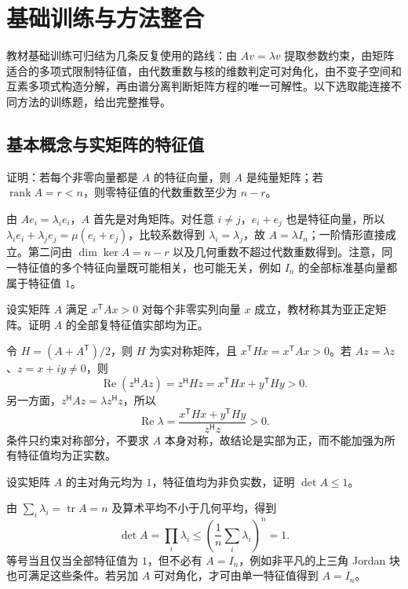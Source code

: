 \section{基础训练与方法整合}
\label{sec:xie-ex-eig-eigen-exercises}

教材基础训练可归结为几条反复使用的路线：由 $Av=\lambda v$ 提取参数约束，由矩阵适合的多项式限制特征值，由代数重数与核的维数判定可对角化，由不变子空间和互素多项式构造分解，再由谱分离判断矩阵方程的唯一可解性。以下选取能连接不同方法的训练题，给出完整推导。

\subsection{基本概念与实矩阵的特征值}

\begin{example}
证明：若每个非零向量都是 $A$ 的特征向量，则 $A$ 是纯量矩阵；若 $\operatorname{rank}A=r<n$，则零特征值的代数重数至少为 $n-r$。
\end{example}
\begin{solve}
由 $Ae_i=\lambda_i e_i$，$A$ 首先是对角矩阵。对任意 $i\ne j$，$e_i+e_j$ 也是特征向量，所以 $\lambda_ie_i+\lambda_je_j=\mu(e_i+e_j)$，比较系数得到 $\lambda_i=\lambda_j$，故 $A=\lambda I_n$；一阶情形直接成立。第二问由 $\dim\ker A=n-r$ 以及几何重数不超过代数重数得到。注意，同一特征值的多个特征向量既可能相关，也可能无关，例如 $I_n$ 的全部标准基向量都属于特征值 $1$。
\end{solve}

\begin{example}
设实矩阵 $A$ 满足 $x^{\mathsf T}Ax>0$ 对每个非零实列向量 $x$ 成立，教材称其为亚正定矩阵。证明 $A$ 的全部复特征值实部均为正。
\end{example}
\begin{solve}
令 $H=(A+A^{\mathsf T})/2$，则 $H$ 为实对称矩阵，且 $x^{\mathsf T}Hx=x^{\mathsf T}Ax>0$。若 $Az=\lambda z$、$z=x+iy\ne0$，则
\[
\operatorname{Re}(z^{\mathsf H}Az)
=z^{\mathsf H}Hz=x^{\mathsf T}Hx+y^{\mathsf T}Hy>0.
\]
另一方面，$z^{\mathsf H}Az=\lambda z^{\mathsf H}z$，所以
\[
\operatorname{Re}\lambda
=\frac{x^{\mathsf T}Hx+y^{\mathsf T}Hy}{z^{\mathsf H}z}>0.
\]
条件只约束对称部分，不要求 $A$ 本身对称，故结论是实部为正，而不能加强为所有特征值均为正实数。
\end{solve}

\begin{example}
设实矩阵 $A$ 的主对角元均为 $1$，特征值均为非负实数，证明 $\det A\le1$。
\end{example}
\begin{solve}
由 $\sum_i\lambda_i=\operatorname{tr}A=n$ 及算术平均不小于几何平均，得到
\[
\det A=\prod_i\lambda_i\le\left(\frac1n\sum_i\lambda_i\right)^n=1.
\]
等号当且仅当全部特征值为 $1$，但不必有 $A=I_n$，例如非平凡的上三角 Jordan 块也可满足这些条件。若另加 $A$ 可对角化，才可由单一特征值得到 $A=I_n$。
\end{solve}

